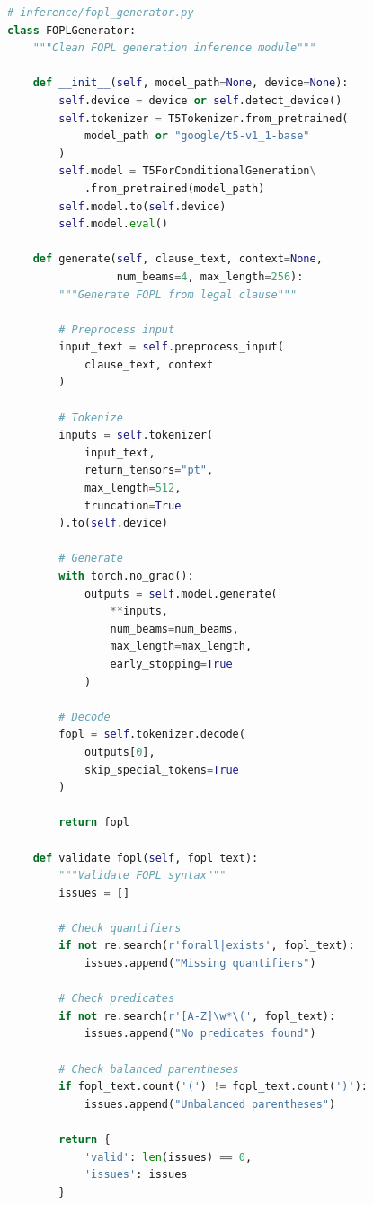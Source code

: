 \documentclass[12pt,a4paper]{article}
\begin{document}
\begin{lstlisting}[language=Python, caption=FOPL Generator Class]
# inference/fopl_generator.py
class FOPLGenerator:
    """Clean FOPL generation inference module"""
    
    def __init__(self, model_path=None, device=None):
        self.device = device or self.detect_device()
        self.tokenizer = T5Tokenizer.from_pretrained(
            model_path or "google/t5-v1_1-base"
        )
        self.model = T5ForConditionalGeneration\
            .from_pretrained(model_path)
        self.model.to(self.device)
        self.model.eval()
    
    def generate(self, clause_text, context=None, 
                 num_beams=4, max_length=256):
        """Generate FOPL from legal clause"""
        
        # Preprocess input
        input_text = self.preprocess_input(
            clause_text, context
        )
        
        # Tokenize
        inputs = self.tokenizer(
            input_text,
            return_tensors="pt",
            max_length=512,
            truncation=True
        ).to(self.device)
        
        # Generate
        with torch.no_grad():
            outputs = self.model.generate(
                **inputs,
                num_beams=num_beams,
                max_length=max_length,
                early_stopping=True
            )
        
        # Decode
        fopl = self.tokenizer.decode(
            outputs[0], 
            skip_special_tokens=True
        )
        
        return fopl
    
    def validate_fopl(self, fopl_text):
        """Validate FOPL syntax"""
        issues = []
        
        # Check quantifiers
        if not re.search(r'forall|exists', fopl_text):
            issues.append("Missing quantifiers")
        
        # Check predicates
        if not re.search(r'[A-Z]\w*\(', fopl_text):
            issues.append("No predicates found")
        
        # Check balanced parentheses
        if fopl_text.count('(') != fopl_text.count(')'):
            issues.append("Unbalanced parentheses")
        
        return {
            'valid': len(issues) == 0,
            'issues': issues
        }
\end{lstlisting}
\end{document}
